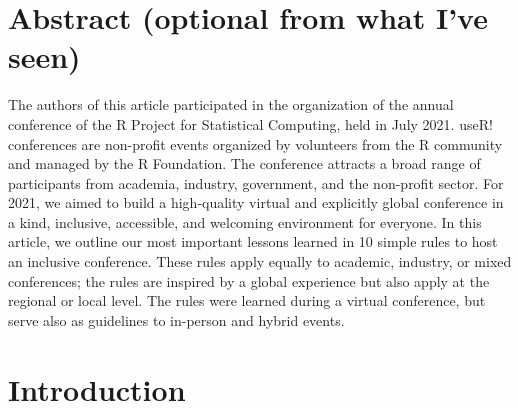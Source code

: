 \documentclass[10pt,letterpaper]{article}
\begin{document}
\section*{Abstract (optional from what I've seen)}

The authors of this article participated in the organization of the annual conference of the R Project for Statistical Computing, held in July 2021. useR! conferences are non-profit events organized by volunteers from the R community and managed by the R Foundation. The conference attracts a broad range of participants from academia, industry, government, and the non-profit sector. For 2021, we aimed to build a high-quality virtual and explicitly global conference in a kind, inclusive, accessible, and welcoming environment for everyone. 
In this article, we outline our most important lessons learned in 10 simple rules to host an inclusive conference. These rules apply equally to academic, industry, or mixed conferences; the rules are inspired by a global experience but also apply at the regional or local level. The rules were learned during a virtual conference, but serve also as guidelines to in-person and hybrid events. 





\linenumbers

\section*{Introduction}
\end{document}
